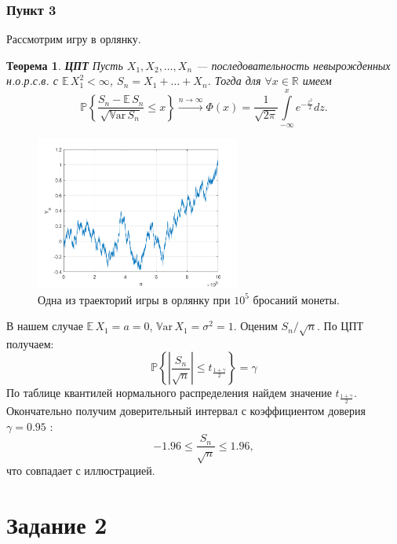 \documentclass[oneside, final, 12pt]{article}
\def\Var{{\mathbb{V}\textrm{ar}}\,}
\def\E{{\mathbb{E} }\,}
\def\P{{\mathbb{P} }}
\newtheorem{theorem}{Теорема}
\begin{document}
\subsubsection{Пункт 3}
    Рассмотрим игру в орлянку. 
    \begin{theorem}{\textbf{ЦПТ}}
    \newline
        Пусть $X_1, X_2, \ldots, X_n$ --- последовательность невырожденных н.о.р.с.в.  
		с $\E X_1^2<\infty$, $S_n = X_1 + \ldots + X_n$. Тогда для $\forall x \in \mathbb{R}$ имеем
        $$
            \P\left\{\frac{S_n-\E S_n}{\sqrt{\Var S_n}}\leqslant x\right\} 
            \xrightarrow[]{n \rightarrow \infty} \Phi(x) = \frac{1}{\sqrt{2\pi}}
                                \int\limits^{x}_{-\infty}e^{-\frac{z^2}{2}}dz.
        $$
    \end{theorem}
    \begin{figure}[h!]
		\centering
		\includegraphics[width=0.6\textwidth]{../code/Task_1/pict/h_t_ex.png}
		\caption{Одна из траекторий игры в орлянку при $10^5$ бросаний монеты. }
    \end{figure}
    В нашем случае $\E X_1 = a = 0 $, $\Var X_1 = \sigma^2 = 1$. 
    \newline Оценим $S_n/\sqrt{n}$. По ЦПТ получаем:
    $$
        \P\left\{\left|\frac{S_n}{\sqrt{n}}\right| \leqslant 
            t_{\frac{1+\gamma}{2}} \right\} = \gamma
    $$
    По таблице квантилей нормального распределения найдем значение $t_{\frac{1+\gamma}{2}}.$
    \newline Окончательно получим доверительный интервал с коэффициентом доверия $\gamma= 0.95$ : 
        $$
			 -1.96 \leqslant \frac{S_n}{\sqrt{n}} \leqslant  1.96,
		$$
	что совпадает с иллюстрацией.

\section{Задание 2}
\end{document}
